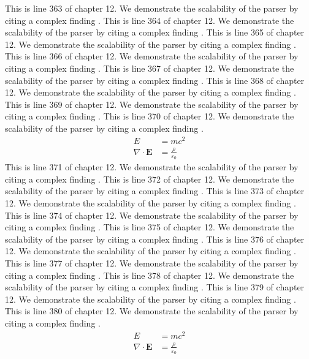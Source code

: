This is line 363 of chapter 12. We demonstrate the scalability of the parser by citing a complex finding \cite{ref12_363}.
This is line 364 of chapter 12. We demonstrate the scalability of the parser by citing a complex finding \cite{ref12_364}.
This is line 365 of chapter 12. We demonstrate the scalability of the parser by citing a complex finding \cite{ref12_365}.
This is line 366 of chapter 12. We demonstrate the scalability of the parser by citing a complex finding \cite{ref12_366}.
This is line 367 of chapter 12. We demonstrate the scalability of the parser by citing a complex finding \cite{ref12_367}.
This is line 368 of chapter 12. We demonstrate the scalability of the parser by citing a complex finding \cite{ref12_368}.
This is line 369 of chapter 12. We demonstrate the scalability of the parser by citing a complex finding \cite{ref12_369}.
This is line 370 of chapter 12. We demonstrate the scalability of the parser by citing a complex finding \cite{ref12_370}.
\begin{align*}
  E &= mc^2 \\
  \nabla \cdot \mathbf{E} &= \frac{\rho}{\varepsilon_0}
\end{align*}
This is line 371 of chapter 12. We demonstrate the scalability of the parser by citing a complex finding \cite{ref12_371}.
This is line 372 of chapter 12. We demonstrate the scalability of the parser by citing a complex finding \cite{ref12_372}.
This is line 373 of chapter 12. We demonstrate the scalability of the parser by citing a complex finding \cite{ref12_373}.
This is line 374 of chapter 12. We demonstrate the scalability of the parser by citing a complex finding \cite{ref12_374}.
This is line 375 of chapter 12. We demonstrate the scalability of the parser by citing a complex finding \cite{ref12_375}.
This is line 376 of chapter 12. We demonstrate the scalability of the parser by citing a complex finding \cite{ref12_376}.
This is line 377 of chapter 12. We demonstrate the scalability of the parser by citing a complex finding \cite{ref12_377}.
This is line 378 of chapter 12. We demonstrate the scalability of the parser by citing a complex finding \cite{ref12_378}.
This is line 379 of chapter 12. We demonstrate the scalability of the parser by citing a complex finding \cite{ref12_379}.
This is line 380 of chapter 12. We demonstrate the scalability of the parser by citing a complex finding \cite{ref12_380}.
\begin{align*}
  E &= mc^2 \\
  \nabla \cdot \mathbf{E} &= \frac{\rho}{\varepsilon_0}
\end{align*}
